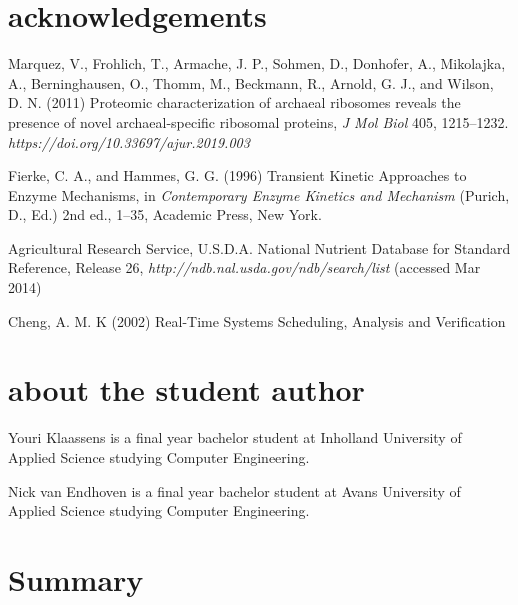 \documentclass[10pt]{article}
\begin{document}
\section*{acknowledgements}

\begin{thebibliography}{9} %

 Marquez, V., Frohlich, T., Armache, J. P., Sohmen, D., Donhofer, A., Mikolajka, A., Berninghausen, O., Thomm, M., Beckmann, R., Arnold, G. J., and Wilson, D. N. (2011) Proteomic characterization of archaeal ribosomes reveals the presence of novel archaeal-specific ribosomal proteins, \textit{J Mol Biol} 405, 1215--1232. \textit {https://doi.org/10.33697/ajur.2019.003}

 Fierke, C. A., and Hammes, G. G. (1996) Transient Kinetic Approaches to Enzyme Mechanisms, in \textit{Contemporary Enzyme Kinetics and Mechanism} (Purich, D., Ed.) 2nd ed., 1--35, Academic Press, New York.

 Agricultural Research Service, U.S.D.A. National Nutrient Database for Standard Reference, Release 26, \textit{http://ndb.nal.usda.gov/ndb/search/list} (accessed Mar 2014)

 Cheng, A. M. K (2002) Real-Time Systems Scheduling, Analysis and Verification

\end{thebibliography}

\section*{about the student author}
Youri Klaassens is a final year bachelor student at Inholland University of Applied Science studying Computer Engineering.

Nick van Endhoven is a final year bachelor student at Avans University of Applied Science studying Computer Engineering.

\section{Summary}
\end{document}
